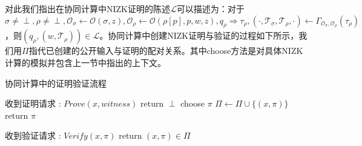 对此我们指出在协同计算中NIZK证明的陈述$\mathcal{L}$可以描述为：对于$\sigma \neq \perp, \rho \neq \perp, \mathcal{O}_\sigma \leftarrow \mathcal{O}(\sigma, z), \mathcal{O}_\rho \leftarrow \mathcal{O}(\rho[p], p, w, z), q_\rho \Rightarrow \tau_\rho, (\cdot, \mathcal{T}_\sigma, \mathcal{T}_\rho, \cdot) \leftarrow \Gamma_{\mathcal{O}_\sigma, \mathcal{O}_\rho}(\tau_\rho)$，则$(q_\rho, (w, \mathcal{T}_\rho)) \in \mathcal{L}$。协同计算中创建NIZK证明与验证的过程如下所示，我们用$\Pi$指代已创建的公开输入与证明的配对关系。其中choose方法是对具体NIZK计算的模拟并包含上一节中指出的上下文。

\begin{breakablealgorithm}
    \caption{协同计算中的证明验证流程}
    \label{alg:ch3-5}
    \begin{algorithmic} 
        \item [收到证明请求]: $Prove(x, witness)$
        \STATE return $\perp$
        \ENDIF
        \REPEAT
        \STATE choose $\pi$
        \UNTIL {$\pi \neq \perp \wedge (\cdot, \pi) \notin \Pi$}
        \STATE $\Pi \leftarrow \Pi \cup \{(x, \pi)\}$
        \STATE return $\pi$
        
        \item [收到验证请求]: $Verify(x, \pi)$
        \STATE return $(x, \pi) \in \Pi$
    \end{algorithmic}
\end{breakablealgorithm}